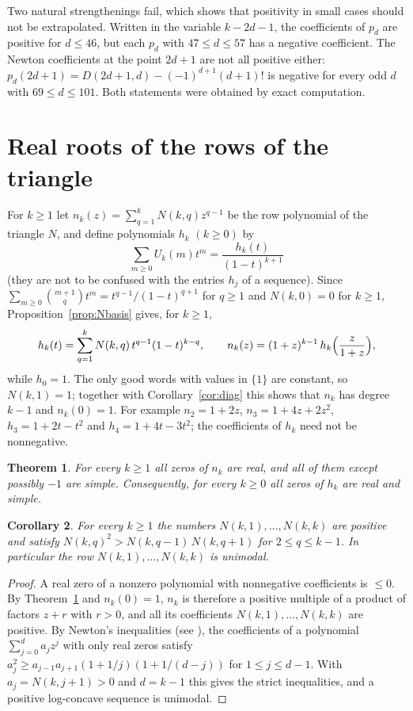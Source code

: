 \documentclass[11pt]{amsart}
\newtheorem{theorem}{Theorem}[section]
\newtheorem{corollary}[theorem]{Corollary}
\theoremstyle{definition}
\begin{document}
Two natural strengthenings fail, which shows that positivity in small cases should not be extrapolated. Written in the variable $k-2d-1$, the coefficients of $p_d$ are positive for $d\le46$, but each $p_d$ with $47\le d\le57$ has a negative coefficient. The Newton coefficients at the point $2d+1$ are not all positive either: $p_d(2d+1)=D(2d+1,d)-(-1)^{d+1}(d+1)!$ is negative for every odd $d$ with $69\le d\le101$. Both statements were obtained by exact computation.

\section{Real roots of the rows of the triangle}\label{sec:realroots}

For $k\ge1$ let $n_k(z)=\sum_{q=1}^{k}N(k,q)z^{q-1}$ be the row polynomial of the triangle $N$, and define polynomials $h_k$ $(k\ge0)$ by
\[
  \sum_{m\ge0}U_k(m)t^m=\frac{h_k(t)}{(1-t)^{k+1}}
\]
(they are not to be confused with the entries $h_j$ of a sequence). Since $\sum_{m\ge0}\binom{m+1}{q}t^m=t^{q-1}/(1-t)^{q+1}$ for $q\ge1$ and $N(k,0)=0$ for $k\ge1$, Proposition~\ref{prop:Nbasis} gives, for $k\ge1$,
\begin{equation}\label{eq:hN}
  h_k(t)=\sum_{q=1}^{k}N(k,q)\,t^{q-1}(1-t)^{k-q},\qquad n_k(z)=(1+z)^{k-1}\,h_k\Bigl(\frac{z}{1+z}\Bigr),
\end{equation}
while $h_0=1$. The only good words with values in $\{1\}$ are constant, so $N(k,1)=1$; together with Corollary~\ref{cor:diag} this shows that $n_k$ has degree $k-1$ and $n_k(0)=1$. For example $n_2=1+2z$, $n_3=1+4z+2z^2$, $h_3=1+2t-t^2$ and $h_4=1+4t-3t^2$; the coefficients of $h_k$ need not be nonnegative.

\begin{theorem}\label{thm:realroots}
For every $k\ge1$ all zeros of $n_k$ are real, and all of them except possibly $-1$ are simple. Consequently, for every $k\ge0$ all zeros of $h_k$ are real and simple.
\end{theorem}

\begin{corollary}\label{cor:logconcave}
For every $k\ge1$ the numbers $N(k,1),\dots,N(k,k)$ are positive and satisfy $N(k,q)^2>N(k,q-1)\,N(k,q+1)$ for $2\le q\le k-1$. In particular the row $N(k,1),\dots,N(k,k)$ is unimodal.
\end{corollary}

\begin{proof}
A real zero of a nonzero polynomial with nonnegative coefficients is $\le0$. By Theorem~\ref{thm:realroots} and $n_k(0)=1$, $n_k$ is therefore a positive multiple of a product of factors $z+r$ with $r>0$, and all its coefficients $N(k,1),\dots,N(k,k)$ are positive. By Newton's inequalities (see \cite{Stanley89}), the coefficients of a polynomial $\sum_{j=0}^{d}a_jz^j$ with only real zeros satisfy $a_j^2\ge a_{j-1}a_{j+1}(1+1/j)(1+1/(d-j))$ for $1\le j\le d-1$. With $a_j=N(k,j+1)>0$ and $d=k-1$ this gives the strict inequalities, and a positive log-concave sequence is unimodal.
\end{proof}
\end{document}
